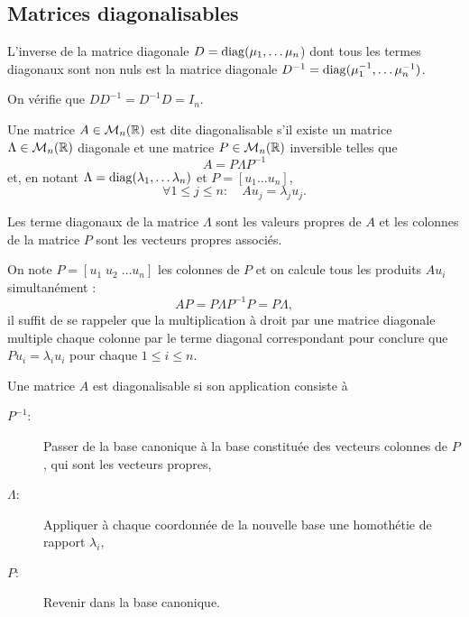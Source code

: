 \subsection{Matrices diagonalisables} \label{sec:MatDiag}

\begin{lemma}
  L'inverse de la matrice diagonale $D = \operatorname{diag}(\mu_1, \dots \mu_n$) dont tous les termes diagonaux sont non nuls est la matrice diagonale $D^{-1} = \operatorname{diag}(\mu_1^{-1}, \dots \mu_n^{-1})$.
\end{lemma}

\proof
On vérifie que $D D^{-1} = D^{-1} D = I_n$.
\eproof

\begin{definition}
  Une matrice $A \in \mathcal{M}_n(\mathbb{R})$ est dite diagonalisable s'il existe un matrice $\Lambda \in \mathcal{M}_n(\mathbb{R})$ diagonale et une matrice $P \in \mathcal{M}_n(\mathbb{R})$ inversible telles que
  $$
  A = P \Lambda P^{-1}
  $$
  et, en notant $\Lambda = \operatorname{diag}(\lambda_1, \dots \lambda_n)$ et $P = [u_1 \dots u_n]$, 
  $$
  \forall 1 \leq j \leq n: \quad A u_j = \lambda_j u_j.
  $$
\end{definition}

\begin{proposition}
  Les terme diagonaux de la matrice $\Lambda$ sont les valeurs propres de $A$ et les colonnes de la matrice $P$ sont les vecteurs propres associés.
\end{proposition}

\proof
  On note $P = [u_1 \; u_2 \; \dots u_n]$ les colonnes de $P$ et on calcule tous les produits $A u_i$ simultanément : 
  $$
  A P = P \Lambda P^{-1} P = P \Lambda,
  $$
  il suffit de se rappeler que la multiplication à droit par une matrice diagonale multiple chaque colonne par le terme diagonal correspondant pour conclure que $P u_i = \lambda_i u_i$ pour chaque $1 \leq i \leq n$.
\eproof

\remark
Une matrice $A$ est diagonalisable si son application consiste à
\begin{description}
 \item[$P^{-1}$:] Passer de la base canonique à la base constituée des vecteurs colonnes de $P$, qui sont les vecteurs propres,
 \item[$\Lambda$:] Appliquer à chaque coordonnée de la nouvelle base une homothétie de rapport $\lambda_i$,
 \item[$P$:] Revenir dans la base canonique.
\end{description}

